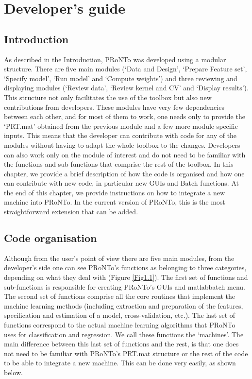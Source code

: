 
\chapter{Developer's guide}
\minitoc

\section{Introduction}

As described in the Introduction, PRoNTo was developed using a modular structure. There are five main modules (`Data and Design', `Prepare Feature set', `Specify model', `Run model' and `Compute weights') and three reviewing and displaying modules (`Review data', `Review kernel and CV' and `Display results'). This structure not only facilitates the use of the toolbox but also new contributions from developers. These modules have very few dependencies between each other, and for most of them to work, one needs only to provide the `PRT.mat' obtained from the previous module and a few more module specific inputs. This means that the developer can contribute with code for any of the modules without having to adapt the whole toolbox to the changes. Developers can also work only on the module of interest and do not need to be familiar with the functions and sub functions that comprise the rest of the toolbox. In this chapter, we provide a brief description of how the code is organised and how one can contribute with new code, in particular new GUIs and Batch functions. At the end of this chapter, we provide instructions on how to integrate a new machine into PRoNTo. In the current version of PRoNTo, this is the most straightforward extension that can be added. 

\section{Code organisation}

Although from the user's point of view there are five main modules, from the developer's side one can see PRoNTo's functions as belonging to three categories, depending on what they deal with (Figure \ref{Fig1.1}). The first set of functions and sub-functions is responsible for creating PRoNTo's GUIs and matlabbatch menu. The second set of functions comprise all the core routines that implement the machine learning methods (including extraction and preparation of the features, specification and estimation of a model, cross-validation, etc.). The last set of functions correspond to the actual machine learning algorithms that PRoNTo uses for classification and regression. We call these functions the `machines'. The main difference between this last set of functions and the rest, is that one does not need to be familiar with PRoNTo's PRT.mat structure or the rest of the code to be able to integrate a new machine. This can be done very easily, as shown below.

